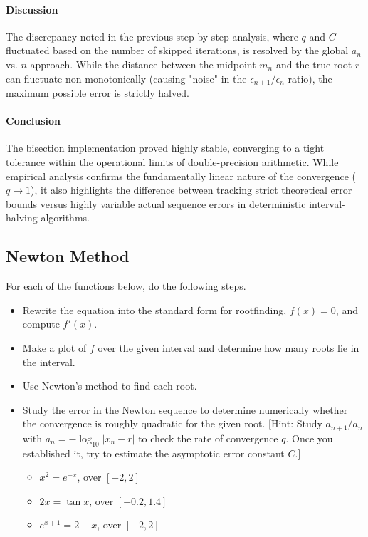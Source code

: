 \begin{solution}
	\paragraph{Discussion}
	The discrepancy noted in the previous step-by-step analysis, where $q$ and
	$C$ fluctuated based on the number of skipped iterations, is resolved by the
	global $a_n$ vs. $n$ approach. While the distance between the midpoint $m_n$
	and the true root $r$ can fluctuate non-monotonically (causing "noise" in
	the $\epsilon_{n+1}/\epsilon_n$ ratio), the maximum possible error is
	strictly halved.

	\paragraph{Conclusion}
	The bisection implementation proved highly stable, converging to a tight
	tolerance within the operational limits of double-precision arithmetic.
	While empirical analysis confirms the fundamentally linear nature of the
	convergence ($q \to 1$), it also highlights the difference between tracking
	strict theoretical error bounds versus highly variable actual sequence
	errors in deterministic interval-halving algorithms.

\end{solution}

\subsection{Newton Method}

\begin{exercise}
	For each of the functions below, do the following steps.

	\begin{itemize}
		\item Rewrite the equation into the standard form for rootfinding, $f(x)
			      = 0$, and compute $f'(x)$.
		\item Make a plot of $f$ over the given interval and determine how many
		      roots lie in the interval.
		\item Use Newton's method to find each root.
		\item Study the error in the Newton sequence to determine numerically
		      whether the convergence is roughly quadratic for the given root. [Hint:
				      Study $a_{n+1}/a_{n}$ with $a_n=-\log_{10}|x_n-r|$ to check the rate of
				      convergence $q$. Once you established it, try to estimate the asymptotic
				      error constant $C$.]

		      \begin{itemize}
			      \item $x^2=e^{-x}$, over $[-2,2]$

			      \item$2x = \tan x$, over $[-0.2,1.4]$

			      \item $e^{x+1}=2+x$, over $[-2,2]$
		      \end{itemize}
	\end{itemize}
\end{exercise}

